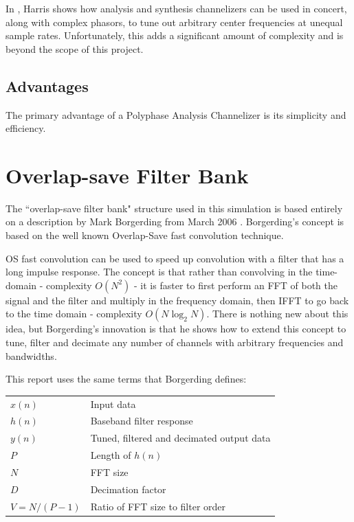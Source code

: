 \documentclass[12pt]{report}
\begin{document}
In \cite{Harris2}, Harris shows how analysis and synthesis
channelizers can be used in concert, along with complex phasors, to tune out
arbitrary center frequencies at unequal sample rates. Unfortunately, this adds
a significant amount of complexity and is beyond the scope of this project.

\subsection{Advantages}
\label{sec:poly_advantages}
The primary advantage of a Polyphase Analysis Channelizer is its simplicity and efficiency.

\section{Overlap-save Filter Bank}
\label{sec:filter_bank}
The ``overlap-save filter bank" structure used in this simulation is based
entirely on a description by Mark Borgerding from March 2006
\cite{Borgerding1}.  Borgerding's concept is based on the well known
Overlap-Save fast convolution technique.

OS fast convolution can be used to speed up convolution with
a filter that has a long impulse response. The concept is that rather than
convolving in the time-domain - complexity $O(N^2)$ - it is faster to first
perform an FFT of both the signal and the filter and multiply in the frequency
domain, then IFFT to go back to the time domain - complexity $O(N\log_2N)$.
There is nothing new about this idea, but Borgerding's innovation is that he
shows how to extend this concept to tune, filter and decimate any number of
channels with arbitrary frequencies and bandwidths.

This report uses the same terms that Borgerding defines:

\begin{tabular}{ll}
    $x(n)$        & Input data \\
    $h(n)$        & Baseband filter response \\
    $y(n)$        & Tuned, filtered and decimated output data \\
    $P$           & Length of $h(n)$ \\
    $N$           & FFT size \\
    $D$           & Decimation factor \\
    $V = N/(P-1)$ & Ratio of FFT size to filter order \\
\end{tabular}
\end{document}
